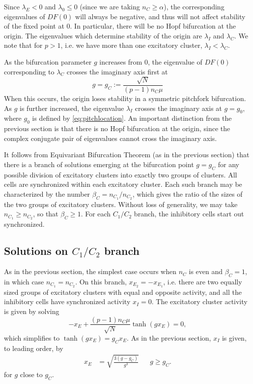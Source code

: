 \documentclass[11pt,reqno]{amsart}
\begin{document}
Since $\lambda_E < 0$ and $\lambda_0 \leq 0$ (since we are taking $n_C \geq \alpha$), the corresponding eigenvalues of $DF(0)$ will always be negative, and thus will not affect stability of the fixed point at 0. In particular, there will be no Hopf bifurcation at the origin. The eigenvalues which determine stability of the origin are $\lambda_I$ and $\lambda_C$. We note that for $p > 1$, i.e. we have more than one excitatory cluster, $\lambda_I < \lambda_C$.

As the bifurcation parameter $g$ increases from 0, the eigenvalue of $DF(0)$ corresponding to $\lambda_C$ crosses the imaginary axis first at 
\begin{equation}
    g = g_C := \frac{\sqrt{N}}{(p-1) n_C \mu}
\end{equation}
When this occurs, the origin loses stability in a symmetric pitchfork bifurcation. As $g$ is further increased, the eigenvalue $\lambda_I$ crosses the imaginary axis at $g = g_0$, where $g_0$ is defined by \cref{eq:pitchlocation}. An important distinction from the previous section is that there is no Hopf bifurcation at the origin, since the complex conjugate pair of eigenvalues cannot cross the imaginary axis.

It follows from Equivariant Bifurcation Theorem (as in the previous section) that there is a branch of solutions emerging at the bifurcation point $g=g_C$ for any possible division of excitatory clusters into exactly two groups of clusters. All cells are synchronized within each excitatory cluster. Each such branch may be characterized by the number $\beta_C = n_{C_1}/n_{C_2}$, which gives the ratio of the sizes of the two groups of excitatory clusters. Without loss of generality, we may take $n_{C_1} \geq n_{C_2}$, so that $\beta_C \geq 1$. For each $C_1/C_2$ branch, the inhibitory cells start out synchronized.

\subsection{Solutions on $C_1/C_2$ branch}

As in the previous section, the simplest case occurs when $n_C$ is even and $\beta_C = 1$, in which case $n_{C_1}=n_{C_2}$. On this branch, $x_{E_2} = -x_{E_1}$, i.e. there are two equally sized groups of excitatory clusters with equal and opposite activity, and all the inhibitory cells have synchronized activity $x_I = 0$. The excitatory cluster activity is given by solving 
\[
-x_E + \frac{(p-1)n_C \mu}{\sqrt{N}} \tanh(g x_E) = 0, 
\]
which simplifies to $\tanh(g x_E) = g_C x_E$. As in the previous section, $x_I$ is given, to leading order, by
\begin{align}\label{eq:xEapprox}
x_E &= \sqrt{ \frac{3(g - g_C) }{g^3}} && g \geq g_C.
\end{align}
for $g$ close to $g_C$. 
\end{document}
